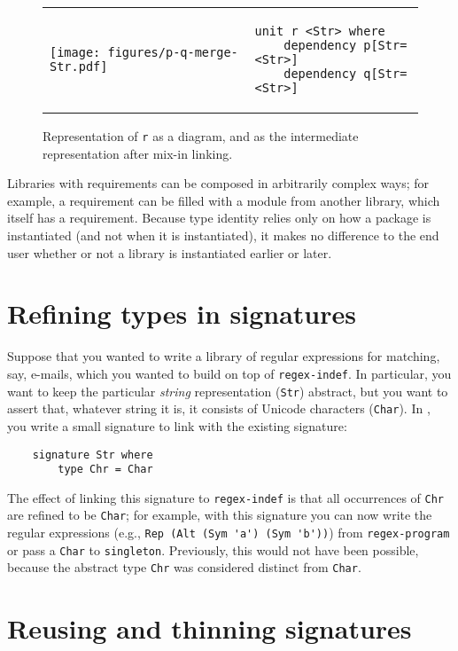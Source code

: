\begin{figure}
\begin{tabular}{p{} p{}}
\center\texttt{[image: figures/p-q-merge-Str.pdf]}
&
\vspace{2em}
\begin{lstlisting}
unit r <Str> where
    dependency p[Str=<Str>]
    dependency q[Str=<Str>]
\end{lstlisting}
\end{tabular}
\caption{Representation of \texttt{r} as a diagram, and as the intermediate
representation after mix-in linking.}
\label{fig:signature-merging-interp}
\end{figure}

Libraries with requirements can be composed in arbitrarily complex ways;
for example, a requirement can be filled with a module from another library,
which itself has a requirement.  Because type identity relies
only on how a package is instantiated (and not when it is instantiated),
it makes no difference to the end user whether or not a library
is instantiated earlier or later.

\section{Refining types in signatures}

Suppose that you wanted to write a library of regular expressions for
matching, say, e-mails, which you wanted to build on top of
\texttt{regex-indef}.  In particular, you want to keep the particular
\emph{string} representation (\verb|Str|) abstract, but you want
to assert that, whatever string it is, it consists of Unicode
characters (\verb|Char|).  In \Backpack{}, you
write a small signature to link with the existing signature:

\begin{lstlisting}
    signature Str where
        type Chr = Char
\end{lstlisting}

\noindent
The effect of linking this signature to \verb|regex-indef| is that
all occurrences of \verb|Chr| are refined to be \verb|Char|;
for example, with this signature you can now write the regular
expressions (e.g., \verb|Rep (Alt (Sym 'a') (Sym 'b'))|) from
\verb|regex-program| or pass a \verb|Char| to \verb|singleton|.
Previously, this would not have been possible, because the
abstract type \verb|Chr| was considered distinct from \verb|Char|.

\section{Reusing and thinning signatures}

